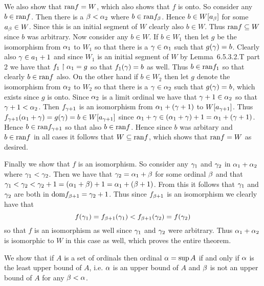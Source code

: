 \begin{questions}
\begin{solution}
    We also show that $\mathrm{ran} f = W$, which also shows that $f$ is onto.
    So consider any $b \in \mathrm{ran} f$.
    Then there is a $\beta < \alpha_2$ where $b \in \mathrm{ran} f_\beta$.
    Hence $b \in W[a_\beta]$ for some $a_\beta \in W$.
    Since this is an initial segment of $W$ clearly also $b \in W$.
    Thus $\mathrm{ran} f \subseteq W$ since $b$ was arbitrary.
    Now consider any $b \in W$.
    If $b \in W_1$ then let $g$ be the isomorphism from $\alpha_1$ to $W_1$ so that there is a $\gamma \in \alpha_1$ such that $g(\gamma) = b$.
    Clearly also $\gamma \in a_1 + 1$ and since $W_1$ is an initial segment of $W$ by Lemma~6.5.3.2.T part 2 we have that $f_1 \restriction \alpha_1 = g$ so that $f_1(\gamma) = b$ as well.
    Thus $b \in \mathrm{ran} f_1$ so that clearly $b \in \mathrm{ran} f$ also.
    On the other hand if $b \in W_2$ then let $g$ denote the isomorphism from $\alpha_2$ to $W_2$ so that there is a $\gamma \in \alpha_2$ such that $g(\gamma) = b$, which exists since $g$ is onto.
    Since $\alpha_2$ is a limit ordinal we have that $\gamma+1 \in \alpha_2$ so that $\gamma+1 < \alpha_2$.
    Then $f_{\gamma+1}$ is an isomorphism from $\alpha_1 + (\gamma+1)$ to $W[a_{\gamma+1}]$.
    Thus $f_{\gamma+1}(\alpha_1 + \gamma) = g(\gamma) = b \in W[a_{\gamma+1}]$ since $\alpha_1 + \gamma \in (\alpha_1 + \gamma) + 1 = \alpha_1 + (\gamma+1)$.
    Hence $b \in \mathrm{ran} f_{\gamma+1}$ so that also $b \in \mathrm{ran} f$.
    Hence since $b$ was arbitary and $b \in \mathrm{ran} f$ in all cases it follows that $W \subseteq \mathrm{ran} f$, which shows that $\mathrm{ran} f = W$ as desired.
    
    Finally we show that $f$ is an isomorphism.
    So consider any $\gamma_1$ and $\gamma_2$ in $\alpha_1 + \alpha_2$ where $\gamma_1 < \gamma_2$.
    Then we have that $\gamma_2 = \alpha_1 + \beta$ for some ordinal $\beta$ and that $\gamma_1 < \gamma_2 < \gamma_2 + 1 = (\alpha_1 + \beta) + 1 = \alpha_1 + (\beta + 1)$.
    From this it follows that $\gamma_1$ and $\gamma_2$ are both in $\mathrm{dom} f_{\beta+1} = \gamma_2 + 1$.
    Thus since $f_{\beta+1}$ is an isomorphism we clearly have that
    $$
    f(\gamma_1) = f_{\beta+1}(\gamma_1) < f_{\beta+1}(\gamma_2)= f(\gamma_2)
    $$
    so that $f$ is an isomorphism as well since $\gamma_1$ and $\gamma_2$ were arbitrary.
    Thus $\alpha_1 + \alpha_2$ is isomorphic to $W$ in this case as well, which proves the entire theorem. \qedsymbol
\end{solution}


\begin{solution}
    We show that if $A$ is a set of ordinals then ordinal $\alpha = \sup{A}$ if and only if $\alpha$ is the least upper bound of $A$, i.e. $\alpha$ is an upper bound of $A$ and $\beta$ is not an upper bound of $A$ for any $\beta < \alpha$.


\end{solution}
\end{questions}
